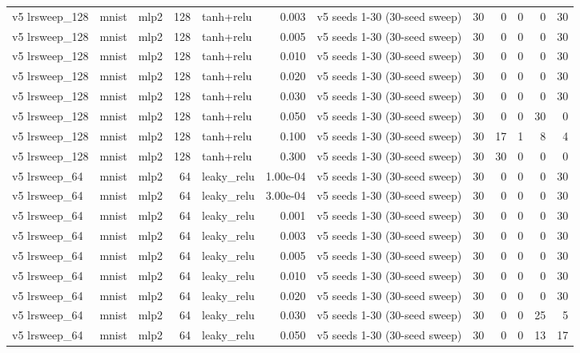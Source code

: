 \begin{table}[htbp]
{\begin{tabular}{@{}lllrlrlrrrrr@{}}
v5 lrsweep\_128 & mnist & mlp2 & 128 & tanh+relu & 0.003 & v5 seeds 1-30 (30-seed sweep) & 30 & 0 & 0 & 0 & 30 \\
v5 lrsweep\_128 & mnist & mlp2 & 128 & tanh+relu & 0.005 & v5 seeds 1-30 (30-seed sweep) & 30 & 0 & 0 & 0 & 30 \\
v5 lrsweep\_128 & mnist & mlp2 & 128 & tanh+relu & 0.010 & v5 seeds 1-30 (30-seed sweep) & 30 & 0 & 0 & 0 & 30 \\
v5 lrsweep\_128 & mnist & mlp2 & 128 & tanh+relu & 0.020 & v5 seeds 1-30 (30-seed sweep) & 30 & 0 & 0 & 0 & 30 \\
v5 lrsweep\_128 & mnist & mlp2 & 128 & tanh+relu & 0.030 & v5 seeds 1-30 (30-seed sweep) & 30 & 0 & 0 & 0 & 30 \\
v5 lrsweep\_128 & mnist & mlp2 & 128 & tanh+relu & 0.050 & v5 seeds 1-30 (30-seed sweep) & 30 & 0 & 0 & 30 & 0 \\
v5 lrsweep\_128 & mnist & mlp2 & 128 & tanh+relu & 0.100 & v5 seeds 1-30 (30-seed sweep) & 30 & 17 & 1 & 8 & 4 \\
v5 lrsweep\_128 & mnist & mlp2 & 128 & tanh+relu & 0.300 & v5 seeds 1-30 (30-seed sweep) & 30 & 30 & 0 & 0 & 0 \\
v5 lrsweep\_64 & mnist & mlp2 & 64 & leaky\_relu & 1.00e-04 & v5 seeds 1-30 (30-seed sweep) & 30 & 0 & 0 & 0 & 30 \\
v5 lrsweep\_64 & mnist & mlp2 & 64 & leaky\_relu & 3.00e-04 & v5 seeds 1-30 (30-seed sweep) & 30 & 0 & 0 & 0 & 30 \\
v5 lrsweep\_64 & mnist & mlp2 & 64 & leaky\_relu & 0.001 & v5 seeds 1-30 (30-seed sweep) & 30 & 0 & 0 & 0 & 30 \\
v5 lrsweep\_64 & mnist & mlp2 & 64 & leaky\_relu & 0.003 & v5 seeds 1-30 (30-seed sweep) & 30 & 0 & 0 & 0 & 30 \\
v5 lrsweep\_64 & mnist & mlp2 & 64 & leaky\_relu & 0.005 & v5 seeds 1-30 (30-seed sweep) & 30 & 0 & 0 & 0 & 30 \\
v5 lrsweep\_64 & mnist & mlp2 & 64 & leaky\_relu & 0.010 & v5 seeds 1-30 (30-seed sweep) & 30 & 0 & 0 & 0 & 30 \\
v5 lrsweep\_64 & mnist & mlp2 & 64 & leaky\_relu & 0.020 & v5 seeds 1-30 (30-seed sweep) & 30 & 0 & 0 & 0 & 30 \\
v5 lrsweep\_64 & mnist & mlp2 & 64 & leaky\_relu & 0.030 & v5 seeds 1-30 (30-seed sweep) & 30 & 0 & 0 & 25 & 5 \\
v5 lrsweep\_64 & mnist & mlp2 & 64 & leaky\_relu & 0.050 & v5 seeds 1-30 (30-seed sweep) & 30 & 0 & 0 & 13 & 17 \\

\end{tabular}}
\end{table}
